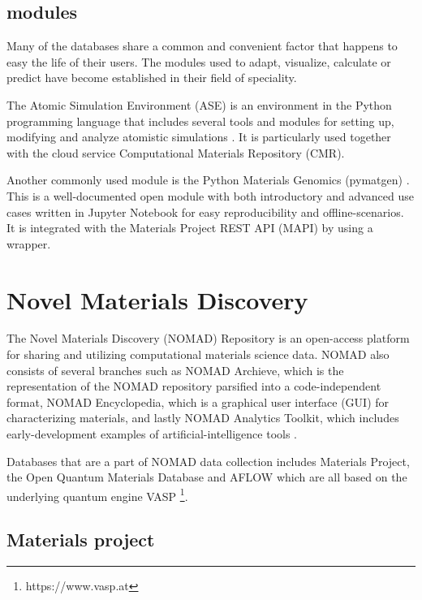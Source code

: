 


\subsection{modules}
Many of the databases share a common and convenient factor that happens to easy the life of their users. The modules used to adapt, visualize, calculate or predict have become established in their field of speciality.


The Atomic Simulation Environment (ASE) is an environment in the Python programming language that includes several tools and modules for setting up, modifying and analyze atomistic simulations \cite{Larsen2017}. It is particularly used together with the cloud service Computational Materials Repository (CMR).

Another commonly used module is the Python Materials Genomics (pymatgen) \cite{Ong2013}. This is a well-documented open module with both introductory and advanced use cases written in Jupyter Notebook for easy reproducibility and offline-scenarios. It is integrated with the Materials Project REST API (MAPI) by using a wrapper.

\section{Novel Materials Discovery}

The Novel Materials Discovery (NOMAD) Repository is an open-access platform for sharing and utilizing computational materials science data. NOMAD also consists of several branches such as NOMAD Archieve, which is the representation of the NOMAD repository parsified into a code-independent format, NOMAD Encyclopedia, which is a graphical user interface (GUI) for characterizing materials, and lastly NOMAD Analytics Toolkit, which includes early-development examples of artificial-intelligence tools \cite{Draxl2019}.

Databases that are a part of NOMAD data collection includes Materials Project, the Open Quantum Materials Database and AFLOW which are all based on the underlying quantum engine VASP \footnote{https://www.vasp.at}.

\subsection{Materials project}

